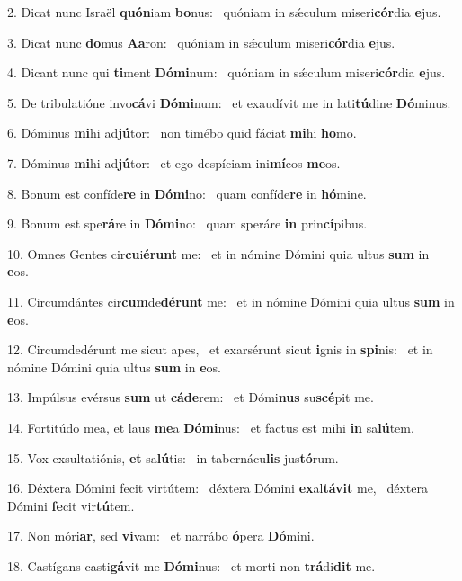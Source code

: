 2. Dicat nunc Israël \textbf{quón}iam \textbf{bo}nus: \ast\  quóniam in sǽculum miseri\textbf{cór}dia \textbf{e}jus.\

3. Dicat nunc \textbf{do}mus \textbf{A}\textbf{a}ron: \ast\  quóniam in sǽculum miseri\textbf{cór}dia \textbf{e}jus.\

4. Dicant nunc qui \textbf{ti}ment \textbf{Dó}\textbf{mi}num: \ast\  quóniam in sǽculum miseri\textbf{cór}dia \textbf{e}jus.\

5. De tribulatióne invo\textbf{cá}vi \textbf{Dó}\textbf{mi}num: \ast\  et exaudívit me in lati\textbf{tú}dine \textbf{Dó}minus.\

6. Dóminus \textbf{mi}hi ad\textbf{jú}tor: \ast\  non timébo quid fáciat \textbf{mi}hi \textbf{ho}mo.\

7. Dóminus \textbf{mi}hi ad\textbf{jú}tor: \ast\  et ego despíciam ini\textbf{mí}cos \textbf{me}os.\

8. Bonum est confíde\textbf{re} in \textbf{Dó}\textbf{mi}no: \ast\  quam confíde\textbf{re} in \textbf{hó}mine.\

9. Bonum est spe\textbf{rá}re in \textbf{Dó}\textbf{mi}no: \ast\  quam speráre \textbf{in} prin\textbf{cí}pibus.\

10. Omnes Gentes cir\textbf{cu}i\textbf{é}\textbf{runt} me: \ast\  et in nómine Dómini quia ultus \textbf{sum} in \textbf{e}os.\

11. Circumdántes cir\textbf{cum}de\textbf{dé}\textbf{runt} me: \ast\  et in nómine Dómini quia ultus \textbf{sum} in \textbf{e}os.\

12. Circumdedérunt me sicut apes, \dag\  et exarsérunt sicut \textbf{i}gnis in \textbf{spi}nis: \ast\  et in nómine Dómini quia ultus \textbf{sum} in \textbf{e}os.\

13. Impúlsus evérsus \textbf{sum} ut \textbf{cá}\textbf{de}rem: \ast\  et Dómi\textbf{nus} su\textbf{scé}pit me.\

14. Fortitúdo mea, et laus \textbf{me}a \textbf{Dó}\textbf{mi}nus: \ast\  et factus est mihi \textbf{in} sa\textbf{lú}tem.\

15. Vox exsultatiónis, \textbf{et} sa\textbf{lú}tis: \ast\  in tabernácu\textbf{lis} jus\textbf{tó}rum.\

16. Déxtera Dómini fecit virtútem: \dag\  déxtera Dómini \textbf{ex}al\textbf{tá}\textbf{vit} me, \ast\  déxtera Dómini \textbf{fe}cit vir\textbf{tú}tem.\

17. Non móri\textbf{ar}, sed \textbf{vi}vam: \ast\  et narrábo \textbf{ó}pera \textbf{Dó}mini.\

18. Castígans casti\textbf{gá}vit me \textbf{Dó}\textbf{mi}nus: \ast\  et morti non \textbf{trá}di\textbf{dit} me.\

